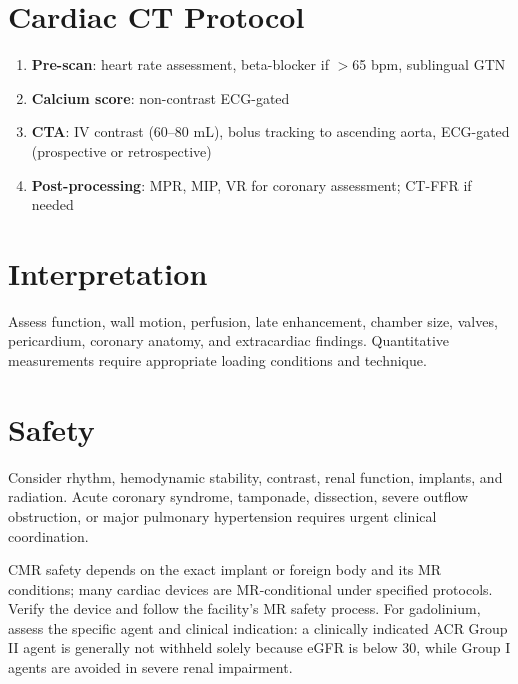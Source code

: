 \section{Cardiac CT Protocol}
\begin{enumerate}
  \item \textbf{Pre-scan}: heart rate assessment, beta-blocker if $>$65 bpm, sublingual GTN
  \item \textbf{Calcium score}: non-contrast ECG-gated
  \item \textbf{CTA}: IV contrast (60--80 mL), bolus tracking to ascending aorta, ECG-gated (prospective or retrospective)
  \item \textbf{Post-processing}: MPR, MIP, VR for coronary assessment; CT-FFR if needed
\end{enumerate}

\section{Interpretation}
Assess function, wall motion, perfusion, late enhancement, chamber size, valves, pericardium, coronary anatomy, and extracardiac findings. Quantitative measurements require appropriate loading conditions and technique.

\section{Safety}
Consider rhythm, hemodynamic stability, contrast, renal function, implants, and radiation. Acute coronary syndrome, tamponade, dissection, severe outflow obstruction, or major pulmonary hypertension requires urgent clinical coordination.

\begin{pearlbox}
CMR safety depends on the exact implant or foreign body and its MR conditions; many cardiac devices are MR-conditional under specified protocols. Verify the device and follow the facility's MR safety process. For gadolinium, assess the specific agent and clinical indication: a clinically indicated ACR Group II agent is generally not withheld solely because eGFR is below 30, while Group I agents are avoided in severe renal impairment.
\end{pearlbox}

\clearpage

